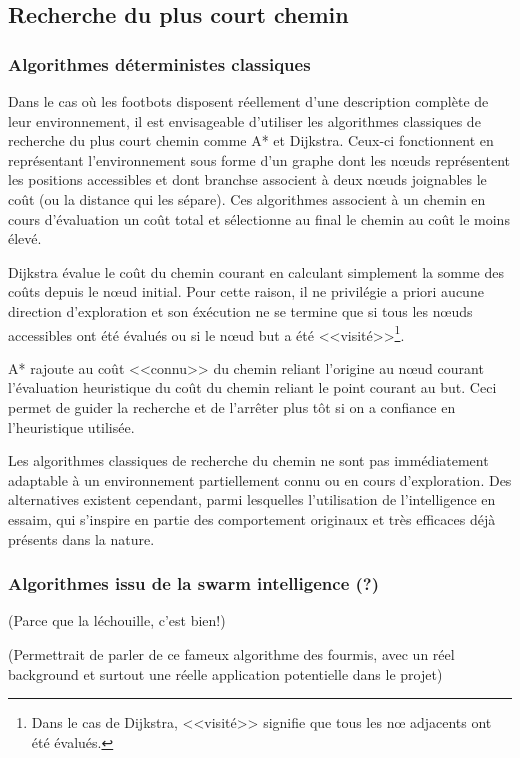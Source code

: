 \subsection{Recherche du plus court chemin}

\subsubsection{Algorithmes déterministes classiques}

Dans le cas où les footbots disposent réellement d'une description complète de leur environnement, il est envisageable d'utiliser les algorithmes classiques de recherche du plus court chemin comme A* et Dijkstra. Ceux-ci fonctionnent en représentant l'environnement sous forme d'un graphe dont les n\oe{}uds représentent les positions accessibles et dont branchse associent à deux n\oe{}uds joignables le coût (ou la distance qui les sépare). Ces algorithmes associent à un chemin en cours d'évaluation un coût total et sélectionne au final le chemin au coût le moins élevé.

Dijkstra évalue le coût du chemin courant en calculant simplement la somme des coûts depuis le n\oe{}ud initial. Pour cette raison, il ne privilégie a priori aucune direction d'exploration et son éxécution ne se termine que si tous les n\oe{}uds accessibles ont été évalués ou si le n\oe{}ud but a été <<visité>>\footnote{Dans le cas de Dijkstra, <<visité>> signifie que tous les n\oe{} adjacents ont été évalués.}.

A* rajoute au coût <<connu>> du chemin reliant l'origine au n\oe{}ud courant l'évaluation heuristique du coût du chemin reliant le point courant au but. Ceci permet de guider la recherche et de l'arrêter plus tôt si on a confiance en l'heuristique utilisée.

Les algorithmes classiques de recherche du chemin ne sont pas immédiatement adaptable à un environnement partiellement connu ou en cours d'exploration. Des alternatives existent cependant, parmi lesquelles l'utilisation de l'intelligence en essaim, qui s'inspire en partie  des comportement originaux et très efficaces déjà présents dans la nature.

\subsubsection{Algorithmes issu de la swarm intelligence (?)}

\cite{pheromonesForaging,antOpti} (Parce que la léchouille, c'est bien!)

(Permettrait de parler de ce fameux algorithme des fourmis, avec un réel background et surtout une réelle application potentielle dans le projet)
